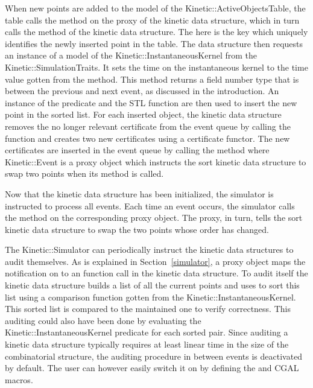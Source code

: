 When new points are added to the model of the
Kinetic::ActiveObjectsTable, the table calls the
 method on the proxy of the kinetic data
structure, which in turn calls the
 method of the kinetic data structure. The
 here is the key which uniquely identifies the
newly inserted point in the table. The data structure then requests an
instance of a model of the Kinetic::InstantaneousKernel from the
Kinetic::SimulationTraits. It sets the time on the instantaneous
kernel to the time value gotten from the
 method. This method returns
a field number type that is between the previous and next event, as
discussed in the introduction. An instance of the
 predicate and the STL
function  are then used to insert the new
point in the sorted list. For each inserted object, the kinetic data
structure removes the no
longer relevant certificate from the event queue by calling the
 function and creates two new
certificates using a 
certificate functor. The new certificates are inserted in the event
queue by calling the 
method where Kinetic::Event is a proxy object which instructs the sort
kinetic data structure to swap two points when its 
method is called.

Now that the kinetic data structure has been initialized, the
simulator is instructed to process all events. Each time an event
occurs, the simulator calls the  method on the
corresponding proxy object. The proxy, in turn, tells the sort kinetic
data structure to swap the two points whose order has changed.

The Kinetic::Simulator can periodically instruct the kinetic data
structures to audit themselves.  As is explained in
Section~\ref{simulator}, a proxy object maps the notification on to an
 function call in the kinetic data structure. To audit
itself the kinetic data structure builds a list of all the current
points and uses  to sort this list using a
comparison function gotten from the Kinetic::InstantaneousKernel.
This sorted list is compared to the maintained one to verify
correctness. This auditing could also have been done by evaluating the
Kinetic::InstantaneousKernel predicate for each sorted pair.  Since
auditing a kinetic data structure typically requires at least linear
time in the size of the combinatorial structure, the auditing
procedure in between events is deactivated by default.  The user can
however easily switch it on by defining the
 and  CGAL
macros.

